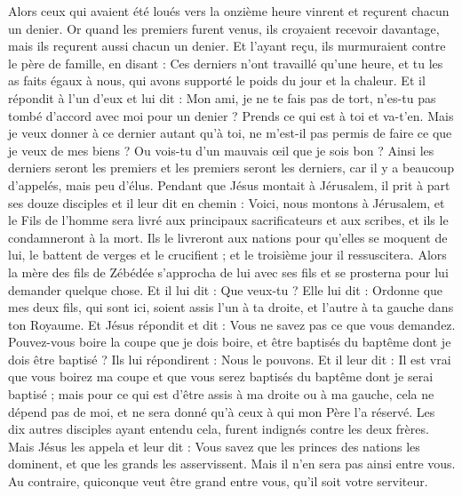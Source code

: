 \begin{multicols}{2}
Alors ceux qui avaient été loués vers la onzième heure vinrent et reçurent chacun un denier.
Or quand les premiers furent venus, ils croyaient recevoir davantage, mais ils reçurent aussi chacun un denier.
Et l'ayant reçu, ils murmuraient contre le père de famille,
en disant : Ces derniers n'ont travaillé qu'une heure, et tu les as faits égaux à nous, qui avons supporté le poids du jour et la chaleur.
Et il répondit à l'un d'eux et lui dit : Mon ami, je ne te fais pas de tort, n'es-tu pas tombé d'accord avec moi pour un denier ?
Prends ce qui est à toi et va-t'en. Mais je veux donner à ce dernier autant qu'à toi,
ne m'est-il pas permis de faire ce que je veux de mes biens ? Ou vois-tu d'un mauvais œil que je sois bon ?
Ainsi les derniers seront les premiers et les premiers seront les derniers, car il y a beaucoup d'appelés, mais peu d'élus.
Pendant que Jésus montait à Jérusalem, il prit à part ses douze disciples et il leur dit en chemin :
Voici, nous montons à Jérusalem, et le Fils de l'homme sera livré aux principaux sacrificateurs et aux scribes, et ils le condamneront à la mort.
Ils le livreront aux nations pour qu'elles se moquent de lui, le battent de verges et le crucifient ; et le troisième jour il ressuscitera.
Alors la mère des fils de Zébédée s'approcha de lui avec ses fils et se prosterna pour lui demander quelque chose.
Et il lui dit : Que veux-tu ? Elle lui dit : Ordonne que mes deux fils, qui sont ici, soient assis l'un à ta droite, et l'autre à ta gauche dans ton Royaume.
Et Jésus répondit et dit : Vous ne savez pas ce que vous demandez. Pouvez-vous boire la coupe que je dois boire, et être baptisés du baptême dont je dois être baptisé ? Ils lui répondirent : Nous le pouvons.
Et il leur dit : Il est vrai que vous boirez ma coupe et que vous serez baptisés du baptême dont je serai baptisé ; mais pour ce qui est d'être assis à ma droite ou à ma gauche, cela ne dépend pas de moi, et ne sera donné qu'à ceux à qui mon Père l'a réservé.
Les dix autres disciples ayant entendu cela, furent indignés contre les deux frères.
Mais Jésus les appela et leur dit : Vous savez que les princes des nations les dominent, et que les grands les asservissent.
Mais il n'en sera pas ainsi entre vous. Au contraire, quiconque veut être grand entre vous, qu'il soit votre serviteur.

\end{multicols}
